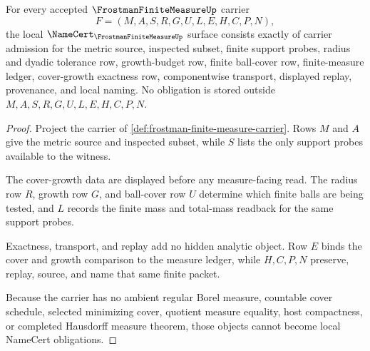 \begin{theorem}
\label{thm:frostman-finite-measure-namecert-obligations}
For every accepted $\FrostmanFiniteMeasureUp$ carrier
$$
F=(M,A,S,R,G,U,L,E,H,C,P,N),
$$
the local $\NameCert_{\FrostmanFiniteMeasureUp}$ surface consists exactly of carrier admission for the metric source, inspected subset, finite support probes, radius and dyadic tolerance row, growth-budget row, finite ball-cover row, finite-measure ledger, cover-growth exactness row, componentwise transport, displayed replay, provenance, and local naming. No obligation is stored outside $M,A,S,R,G,U,L,E,H,C,P,N$.
\end{theorem}
\begin{proof}
Project the carrier of \autoref{def:frostman-finite-measure-carrier}. Rows $M$ and $A$ give the metric source and inspected subset, while $S$ lists the only support probes available to the witness.

The cover-growth data are displayed before any measure-facing read. The radius row $R$, growth row $G$, and ball-cover row $U$ determine which finite balls are being tested, and $L$ records the finite mass and total-mass readback for the same support probes.

Exactness, transport, and replay add no hidden analytic object. Row $E$ binds the cover and growth comparison to the measure ledger, while $H,C,P,N$ preserve, replay, source, and name that same finite packet.

Because the carrier has no ambient regular Borel measure, countable cover schedule, selected minimizing cover, quotient measure equality, host compactness, or completed Hausdorff measure theorem, those objects cannot become local NameCert obligations.
\end{proof}

